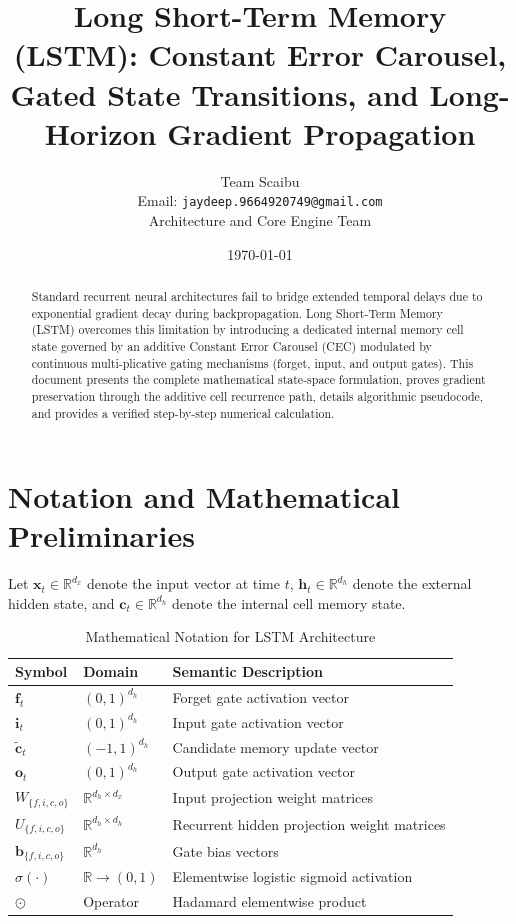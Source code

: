 \documentclass[11pt,a4paper]{article}
\title{Long Short-Term Memory (LSTM): Constant Error Carousel, Gated State Transitions, and Long-Horizon Gradient Propagation}
\author{Team Scaibu \\ \small Email: \texttt{jaydeep.9664920749@gmail.com} \\ \small Architecture and Core Engine Team}
\date{\today}
\theoremstyle{definition}
\begin{document}
\maketitle

\begin{abstract}
Standard recurrent neural architectures fail to bridge extended temporal delays due to exponential gradient decay during backpropagation. Long Short-Term Memory (LSTM) overcomes this limitation by introducing a dedicated internal memory cell state governed by an additive Constant Error Carousel (CEC) modulated by continuous multi-plicative gating mechanisms (forget, input, and output gates). This document presents the complete mathematical state-space formulation, proves gradient preservation through the additive cell recurrence path, details algorithmic pseudocode, and provides a verified step-by-step numerical calculation.
\end{abstract}

\section{Notation and Mathematical Preliminaries}

Let $\mathbf{x}_t \in \mathbb{R}^{d_x}$ denote the input vector at time $t$, $\mathbf{h}_t \in \mathbb{R}^{d_h}$ denote the external hidden state, and $\mathbf{c}_t \in \mathbb{R}^{d_h}$ denote the internal cell memory state.

\begin{table}[h]
\centering
\caption{Mathematical Notation for LSTM Architecture}
\begin{tabular}{lll}
\toprule
\textbf{Symbol} & \textbf{Domain} & \textbf{Semantic Description} \\
\midrule
$\mathbf{f}_t$ & $(0, 1)^{d_h}$ & Forget gate activation vector \\
$\mathbf{i}_t$ & $(0, 1)^{d_h}$ & Input gate activation vector \\
$\tilde{\mathbf{c}}_t$ & $(-1, 1)^{d_h}$ & Candidate memory update vector \\
$\mathbf{o}_t$ & $(0, 1)^{d_h}$ & Output gate activation vector \\
$W_{\{f,i,c,o\}}$ & $\mathbb{R}^{d_h \times d_x}$ & Input projection weight matrices \\
$U_{\{f,i,c,o\}}$ & $\mathbb{R}^{d_h \times d_h}$ & Recurrent hidden projection weight matrices \\
$\mathbf{b}_{\{f,i,c,o\}}$ & $\mathbb{R}^{d_h}$ & Gate bias vectors \\
$\sigma(\cdot)$ & $\mathbb{R} \to (0, 1)$ & Elementwise logistic sigmoid activation \\
$\odot$ & Operator & Hadamard elementwise product \\
\bottomrule
\end{tabular}
\end{table}
\end{document}
